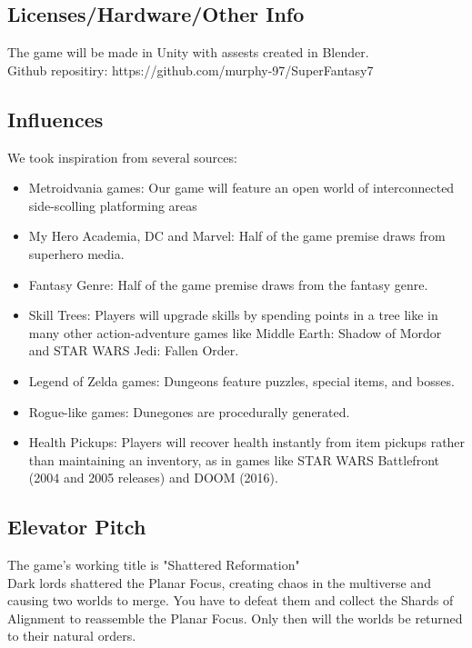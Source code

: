 \documentclass[titlepage]{article}
\begin{document}
\subsection*{Licenses/Hardware/Other Info}
The game will be made in Unity with assests created in Blender.  \\

Github repositiry: https://github.com/murphy-97/SuperFantasy7

\subsection*{Influences}
We took inspiration from several sources:

\begin{itemize}
    \item Metroidvania games: Our game will feature an open world of
    interconnected side-scolling platforming areas
    \item My Hero Academia, DC and Marvel: Half of the game premise draws from
    superhero media.
    \item Fantasy Genre: Half of the game premise draws from the fantasy genre.
    \item Skill Trees: Players will upgrade skills by spending points in a tree
    like in many other action-adventure games like Middle Earth: Shadow of
    Mordor and STAR WARS Jedi: Fallen Order.
    \item Legend of Zelda games: Dungeons feature puzzles, special items, and
    bosses.
    \item Rogue-like games: Dunegones are procedurally generated.
    \item Health Pickups: Players will recover health instantly from item
    pickups rather than maintaining an inventory, as in games like STAR WARS
    Battlefront (2004 and 2005 releases) and DOOM (2016). 
\end{itemize}

\subsection*{Elevator Pitch}
The game's working title is "Shattered Reformation" \\

Dark lords shattered the Planar Focus, creating chaos in the multiverse and
causing two worlds to merge. You have to defeat them and collect the Shards of
Alignment to reassemble the Planar Focus. Only then will the worlds be returned
to their natural orders.
\end{document}
